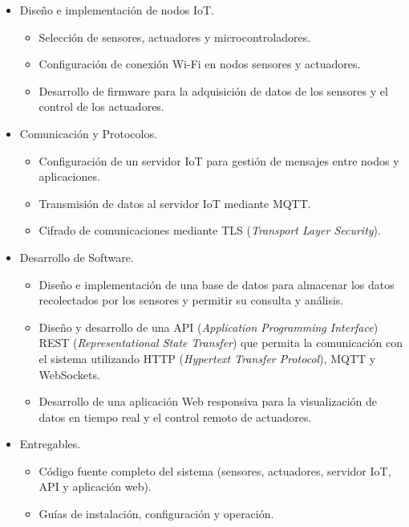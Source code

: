 \begin{itemize}
      \item Diseño e implementación de nodos IoT.
            \begin{itemize}
                  \item Selección de sensores, actuadores y microcontroladores.
                  \item Configuración de conexión Wi-Fi en nodos sensores y actuadores.
                  \item Desarrollo de firmware para la adquisición de datos de los sensores y el
                        control de los actuadores.
            \end{itemize}
\end{itemize}
\begin{itemize}
      \item Comunicación y Protocolos.
            \begin{itemize}
                  \item Configuración de un servidor IoT para gestión de mensajes entre nodos y
                        aplicaciones.
                  \item Transmisión de datos al servidor IoT mediante MQTT.
                  \item Cifrado de comunicaciones mediante TLS (\textit{Transport Layer Security}).
            \end{itemize}
\end{itemize}
\begin{itemize}
      \item Desarrollo de Software.
            \begin{itemize}
                  \item Diseño e implementación de una base de datos para almacenar los datos
                        recolectados por los sensores y permitir su consulta y análisis.
                  \item Diseño y desarrollo de una API (\textit{Application Programming Interface})
                        REST (\textit{Representational State Transfer}) que permita la comunicación con
                        el sistema utilizando HTTP (\textit{Hypertext Transfer Protocol}), MQTT y
                        WebSockets.
                  \item Desarrollo de una aplicación Web responsiva para la visualización de datos en
                        tiempo real y el control remoto de actuadores.
            \end{itemize}
\end{itemize}
\begin{itemize}
      \item Entregables.
            \begin{itemize}
                  \item Código fuente completo del sistema (sensores, actuadores, servidor IoT, API y
                        aplicación web).
                  \item Guías de instalación, configuración y operación.
            \end{itemize}
\end{itemize}

